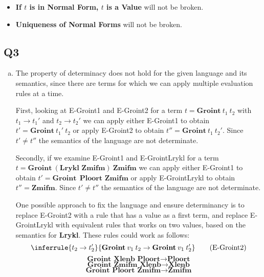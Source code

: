 \documentclass[12pt, fleqn]{article}
\begin{document}
\begin{enumerate}[(a)]
\begin{itemize}
        \item \textbf{If $t$ is in Normal Form, $t$ is a Value} will not be broken.
        \item \textbf{Uniqueness of Normal Forms} will not be broken.
    \end{itemize}

\end{enumerate}

\subsection{Q3}

\begin{enumerate}[(a)]
    \item The property of determinacy does not hold for the given language and its semantics, since there are terms for which we can apply multiple evaluation rules at a time.
    
    First, looking at E-Groint1 and E-Groint2 for a term $t = \textbf{Groint}\:t_1\:t_2$ with $t_1 \rightarrow t_1'$ and $t_2 \rightarrow t_2'$ we can apply either E-Groint1 to obtain $t' = \textbf{Groint}\:t_1'\:t_2$ or apply E-Groint2 to obtain $t'' = \textbf{Groint}\:t_1\:t_2'$. Since $t' \neq t''$ the semantics of the language are not determinate.

    Secondly, if we examine E-Groint1 and E-GrointLrykl for a term \\$t = \textbf{Groint}\:(\textbf{Lrykl Zmifm})\:\textbf{Zmifm}$ we can apply either E-Groint1 to obtain $t' = \textbf{Groint}\:\:\textbf{Ploort Zmifm}$ or apply E-GrointLrykl to obtain $t'' = \textbf{Zmifm}$. Since $t' \neq t''$ the semantics of the language are not determinate.

    One possible approach to fix the language and ensure determinancy is to replace E-Groint2 with a rule that has a value as a first term, and replace E-GrointLrykl with equivalent rules that works on two values, based on the semantics for \textbf{Lrykl}. These rules could work as follows:
    \begin{equation}
        \inferrule{ t_2 \rightarrow t_2' }{ \textbf{Groint}\:v_1\:t_2 \rightarrow \textbf{Groint}\:v_1\:t_2'} \tag{E-Groint2}
    \end{equation}
    \begin{equation}
        { \textbf{Groint Xlenb Ploort} \rightarrow \textbf{Ploort}} \tag{E-GrointXP}
    \end{equation}
    \begin{equation}
        { \textbf{Groint Zmifm Xlenb} \rightarrow \textbf{Xlenb}} \tag{E-GrointZX}
    \end{equation}
    \begin{equation}
        { \textbf{Groint Ploort Zmifm} \rightarrow \textbf{Zmifm}} \tag{E-GrointPZ}
    \end{equation}


\end{enumerate}
\end{document}
